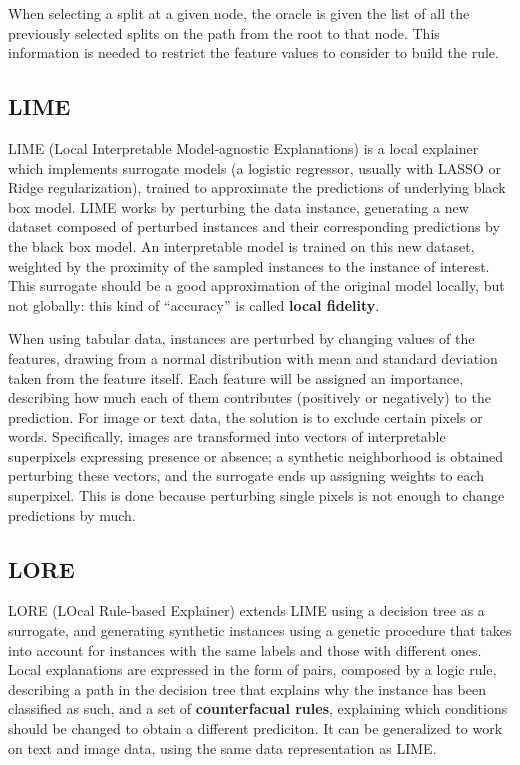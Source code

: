 When selecting a split at a given node, the oracle is given the list of all the previously selected splits on the path from the root to that node. This information is needed to restrict the feature values to consider to build the rule. 

\subsection{LIME}

LIME (Local Interpretable Model-agnostic Explanations) is a local explainer which implements surrogate models (a logistic regressor, usually with LASSO or Ridge regularization), trained to approximate the predictions of underlying black box model. LIME works by perturbing the data instance, generating a new dataset composed of perturbed instances and their corresponding predictions by the black box model. An interpretable model is trained on this new dataset, weighted by the proximity of the sampled instances to the instance of interest. This surrogate should be a good approximation of the original model locally, but not globally: this kind of ``accuracy'' is called \textbf{local fidelity}.

When using tabular data, instances are perturbed by changing values of the features, drawing from a normal distribution with mean and standard deviation taken from the feature itself. Each feature will be assigned an importance, describing how much each of them contributes (positively or negatively) to the prediction. For image or text data, the solution is to exclude certain pixels or words. Specifically, images are transformed into vectors of interpretable superpixels expressing presence or absence; a synthetic neighborhood is obtained perturbing these vectors, and the surrogate ends up assigning weights to each superpixel. This is done because perturbing single pixels is not enough to change predictions by much. 

\subsection{LORE}

LORE (LOcal Rule-based Explainer) extends LIME using a decision tree as a surrogate, and generating synthetic instances using a genetic procedure that takes into account for instances with the same labels and those with different ones. Local explanations are expressed in the form of pairs, composed by a logic rule, describing a path in the decision tree that explains why the instance has been classified as such, and a set of \textbf{counterfacual rules}, explaining which conditions should be changed to obtain a different prediciton. It can be generalized to work on text and image data, using the same data representation as LIME.

